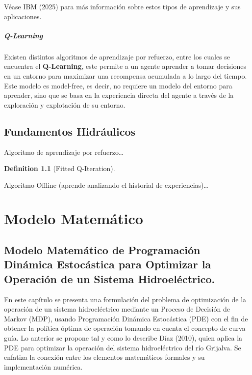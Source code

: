\documentclass[
  letterpaper,
  DIV=11,
  numbers=noendperiod]{scrreprt}
\theoremstyle{definition}
\newtheorem{definition}{Definition}[chapter]
\theoremstyle{remark}
\begin{document}
Véase IBM (2025) para más información sobre estos tipos de aprendizaje y
sus aplicaciones.

\subsubsection{Q-Learning}\label{q-learning}

Existen distintos algoritmos de aprendizaje por refuerzo, entre los
cuales se encuentra el \textbf{Q-Learning}, este permite a un agente
aprender a tomar decisiones en un entorno para maximizar una recompensa
acumulada a lo largo del tiempo. Este modelo es model-free, es decir, no
requiere un modelo del entorno para aprender, sino que se basa en la
experiencia directa del agente a través de la exploración y explotación
de su entorno.

\chapter{Fundamentos Hidráulicos}\label{fundamentos-hidruxe1ulicos}

Algoritmo de aprendizaje por refuerzo\ldots{}

\begin{definition}[Fitted
Q-Iteration]\protect\hypertarget{def-sub}{}\label{def-sub}

Algoritmo Offline (aprende analizando el historial de
experiencias)\ldots{}

\end{definition}

\part{Modelo Matemático}

\chapter{Modelo Matemático de Programación Dinámica Estocástica para
Optimizar la Operación de un Sistema
Hidroeléctrico.}\label{modelo-matemuxe1tico-de-programaciuxf3n-dinuxe1mica-estocuxe1stica-para-optimizar-la-operaciuxf3n-de-un-sistema-hidroeluxe9ctrico.}

En este capítulo se presenta una formulación del problema de
optimización de la operación de un sistema hidroeléctrico mediante un
Proceso de Decisión de Markov (MDP), usando Programación Dinámica
Estocástica (PDE) con el fin de obtener la política óptima de operación
tomando en cuenta el concepto de curva guía. Lo anterior se propone tal
y como lo describe Díaz (2010), quien aplica la PDE para optimizar la
operación del sistema hidroeléctrico del río Grijalva. Se enfatiza la
conexión entre los elementos matemáticos formales y su implementación
numérica.
\end{document}
